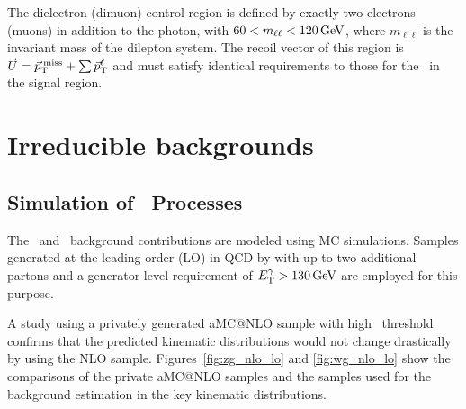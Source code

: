 The dielectron (dimuon) control region is defined by exactly two electrons (muons) in addition to the photon, with $60 < m_{\ell\ell} < 120\,\text{Ge\hspace{-.08em}V}$, where $m_{\ell\ell}$ is the invariant mass of the dilepton system. 
The recoil vector of this region is $\vec{U} = {\vec p}_{\mathrm{T}}^{\kern2pt\text{miss}} + \sum{\vec p}_{\mathrm{T}}^{\ell}$ and must satisfy identical requirements to those for the \ptvecmiss\ in the signal region.

\section{Irreducible backgrounds}
\label{sec:irreducible}

\subsection{Simulation of \vg\ Processes}
\label{sec:vgmc}

The \zinvg\ and \wlng\ background contributions are modeled using MC simulations.
Samples generated at the leading order (LO) in QCD by  with up to two additional partons and a generator-level requirement of $E_{\mathrm{T}}^{\gamma} > 130\,\text{Ge\hspace{-.08em}V}$ are employed for this purpose.

A study using a privately generated aMC@NLO sample with high \ETg\ threshold confirms that the predicted kinematic distributions would not change drastically by using the NLO sample. 
Figures~\ref{fig:zg_nlo_lo} and \ref{fig:wg_nlo_lo} show the comparisons of the private aMC@NLO samples and the  samples used for the background estimation in the key kinematic distributions.

